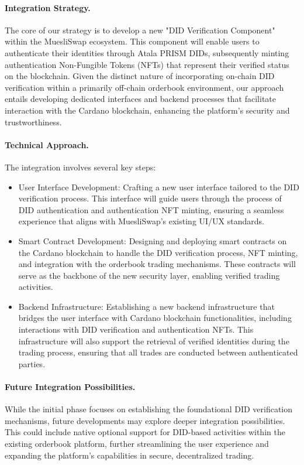 \documentclass[11pt]{article}
\begin{document}
\paragraph{Integration Strategy.} The core of our strategy is to develop a new "DID Verification Component" within the MuesliSwap ecosystem. This component will enable users to authenticate their identities through Atala PRISM DIDs, subsequently minting authentication Non-Fungible Tokens (NFTs) that represent their verified status on the blockchain. Given the distinct nature of incorporating on-chain DID verification within a primarily off-chain orderbook environment, our approach entails developing dedicated interfaces and backend processes that facilitate interaction with the Cardano blockchain, enhancing the platform's security and trustworthiness.

\paragraph{Technical Approach.} The integration involves several key steps:

\begin{itemize}
    \item User Interface Development: Crafting a new user interface tailored to the DID verification process. This interface will guide users through the process of DID authentication and authentication NFT minting, ensuring a seamless experience that aligns with MuesliSwap's existing UI/UX standards.
    \item Smart Contract Development: Designing and deploying smart contracts on the Cardano blockchain to handle the DID verification process, NFT minting, and integration with the orderbook trading mechanisms. These contracts will serve as the backbone of the new security layer, enabling verified trading activities.
    \item Backend Infrastructure: Establishing a new backend infrastructure that bridges the user interface with Cardano blockchain functionalities, including interactions with DID verification and authentication NFTs. This infrastructure will also support the retrieval of verified identities during the trading process, ensuring that all trades are conducted between authenticated parties.

\end{itemize}
\paragraph{Future Integration Possibilities.} While the initial phase focuses on establishing the foundational DID verification mechanisms, future developments may explore deeper integration possibilities. This could include native optional support for DID-based activities within the existing orderbook platform, further streamlining the user experience and expanding the platform's capabilities in secure, decentralized trading.
\end{document}
